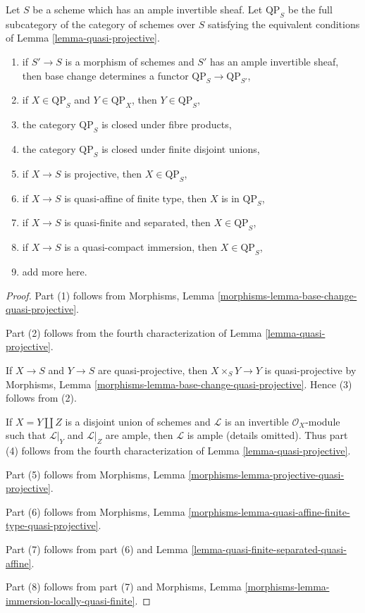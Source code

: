 \begin{lemma}
\label{lemma-category-quasi-projective}
Let $S$ be a scheme which has an ample invertible sheaf.
Let $\text{QP}_S$ be the full subcategory of the
category of schemes over $S$ satisfying the equivalent
conditions of Lemma \ref{lemma-quasi-projective}.
\begin{enumerate}
\item if $S' \to S$ is a morphism of schemes and $S'$ has
an ample invertible sheaf, then base change determines
a functor $\text{QP}_S \to \text{QP}_{S'}$,
\item if $X \in \text{QP}_S$ and $Y \in \text{QP}_X$, then $Y \in \text{QP}_S$,
\item the category $\text{QP}_S$ is closed under fibre products,
\item the category $\text{QP}_S$ is closed under
finite disjoint unions,
\item if $X \to S$ is projective, then $X \in \text{QP}_S$,
\item if $X \to S$ is quasi-affine of finite type, then
$X$ is in $\text{QP}_S$,
\item if $X \to S$ is quasi-finite and separated, then
$X \in \text{QP}_S$,
\item if $X \to S$ is a quasi-compact immersion, then
$X \in \text{QP}_S$,
\item add more here.
\end{enumerate}
\end{lemma}

\begin{proof}
Part (1) follows from Morphisms, Lemma
\ref{morphisms-lemma-base-change-quasi-projective}.

\medskip\noindent
Part (2) follows from the fourth characterization of
Lemma \ref{lemma-quasi-projective}.

\medskip\noindent
If $X \to S$ and $Y \to S$ are quasi-projective, then
$X \times_S Y \to Y$ is quasi-projective by
Morphisms, Lemma \ref{morphisms-lemma-base-change-quasi-projective}.
Hence (3) follows from (2).

\medskip\noindent
If $X = Y \amalg Z$ is a disjoint union of schemes
and $\mathcal{L}$ is an invertible $\mathcal{O}_X$-module
such that $\mathcal{L}|_Y$ and $\mathcal{L}|_Z$ are ample, then
$\mathcal{L}$ is ample (details omitted). Thus
part (4) follows from the fourth characterization of
Lemma \ref{lemma-quasi-projective}.

\medskip\noindent
Part (5) follows from
Morphisms, Lemma \ref{morphisms-lemma-projective-quasi-projective}.

\medskip\noindent
Part (6) follows from
Morphisms, Lemma
\ref{morphisms-lemma-quasi-affine-finite-type-quasi-projective}.

\medskip\noindent
Part (7) follows from part (6) and
Lemma \ref{lemma-quasi-finite-separated-quasi-affine}.

\medskip\noindent
Part (8) follows from part (7) and
Morphisms, Lemma \ref{morphisms-lemma-immersion-locally-quasi-finite}.
\end{proof}

